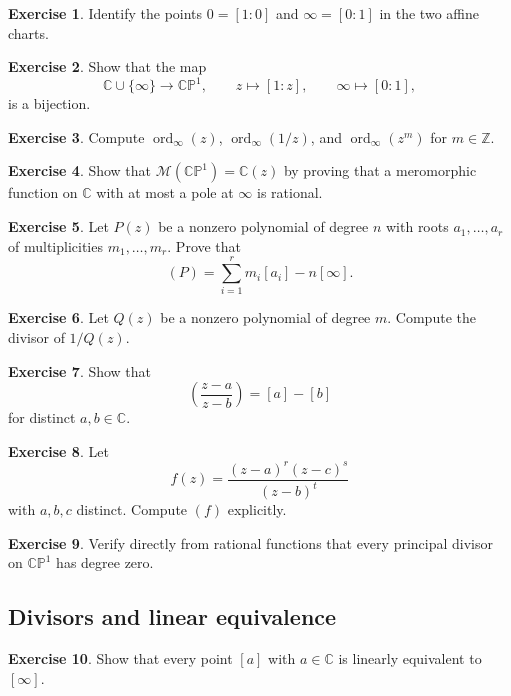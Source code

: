 \documentclass[11pt]{article}
\newcommand{\C}{\mathbb{C}}
\newcommand{\Z}{\mathbb{Z}}
\newcommand{\CP}{\mathbb{CP}}
\newcommand{\MM}{\mathcal{M}}
\newcommand{\ord}{\operatorname{ord}}
\newcommand{\CPone}{\CP^1}
\theoremstyle{plain}
\theoremstyle{definition}
\newtheorem{exercise}{Exercise}
\begin{document}
\begin{exercise}
Identify the points $0=[1:0]$ and $\infty=[0:1]$ in the two affine charts.
\end{exercise}

\begin{exercise}
Show that the map
\[
\C\cup\{\infty\}\longrightarrow \CPone,
\qquad
z\longmapsto [1:z],\qquad \infty\longmapsto [0:1],
\]
is a bijection.
\end{exercise}

\begin{exercise}
Compute $\ord_{\infty}(z)$, $\ord_{\infty}(1/z)$, and $\ord_{\infty}(z^m)$ for $m\in\Z$.
\end{exercise}

\begin{exercise}
Show that $\MM(\CPone)=\C(z)$ by proving that a meromorphic function on $\C$ with at most a pole at $\infty$ is rational.
\end{exercise}

\begin{exercise}
Let $P(z)$ be a nonzero polynomial of degree $n$ with roots $a_1,\dots,a_r$ of multiplicities $m_1,\dots,m_r$. Prove that
\[
(P)=\sum_{i=1}^r m_i[a_i]-n[\infty].
\]
\end{exercise}

\begin{exercise}
Let $Q(z)$ be a nonzero polynomial of degree $m$. Compute the divisor of $1/Q(z)$.
\end{exercise}

\begin{exercise}
Show that
\[
\left(\frac{z-a}{z-b}\right)=[a]-[b]
\]
for distinct $a,b\in\C$.
\end{exercise}

\begin{exercise}
Let
\[
f(z)=\frac{(z-a)^r(z-c)^s}{(z-b)^t}
\]
with $a,b,c$ distinct. Compute $(f)$ explicitly.
\end{exercise}

\begin{exercise}
Verify directly from rational functions that every principal divisor on $\CPone$ has degree zero.
\end{exercise}

\subsection*{Divisors and linear equivalence}
\begin{exercise}
Show that every point $[a]$ with $a\in\C$ is linearly equivalent to $[\infty]$.
\end{exercise}
\end{document}
